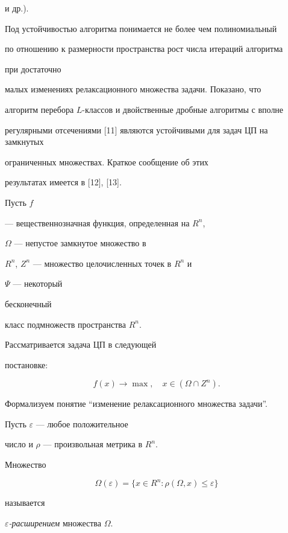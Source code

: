 и др.).


Под устойчивостью алгоритма  понимается не более чем полиномиальный


по отношению к размерности пространства рост числа итераций алгоритма


при достаточно


малых изменениях релаксационного множества задачи. Показано, что


алгоритм перебора $L$-классов и двойственные дробные алгоритмы с вполне


регулярными отсечениями [11] являются устойчивыми для задач ЦП на замкнутых


ограниченных множествах. Краткое сообщение об этих


результатах имеется в [12], [13].


 


Пусть $f$


--- вещественнозначная функция, определенная на $R^{n}$,


$\Omega$ --- непустое замкнутое множество в 


$R^{n}$, $Z^n$ --- множество целочисленных точек в $R^n$  и


$ \Psi$ --- некоторый


бесконечный


класс подмножеств пространства $R^{n}$. 


Рассматривается задача ЦП в следующей 


постановке: 


\begin{equation}


f(x) \to \max,\quad x \in ( \Omega \cap Z^{n}).


\end{equation}





Формализуем понятие ``изменение релаксационного множества задачи''.


Пусть $ \varepsilon$ --- любое положительное 


число и $ \rho$ --- произвольная метрика в $R^{n}$.


Множество


$$


\Omega( \varepsilon)= \{x \in R^{n}: \rho( \Omega,x) \leq \varepsilon \}


$$


называется


{\it $ \varepsilon$-расширением} множества $ \Omega$.


